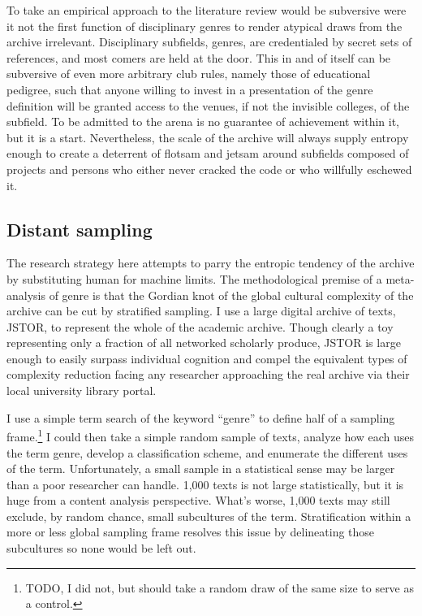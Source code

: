\documentclass[]{book}
\let\rmarkdownfootnote\footnote%
\def\footnote{\protect\rmarkdownfootnote}
\theoremstyle{definition}
\theoremstyle{definition}
\theoremstyle{definition}
\theoremstyle{remark}
\begin{document}
To take an empirical approach to the literature review would be
subversive were it not the first function of disciplinary genres to
render atypical draws from the archive irrelevant. Disciplinary
subfields, genres, are credentialed by secret sets of references, and
most comers are held at the door. This in and of itself can be
subversive of even more arbitrary club rules, namely those of
educational pedigree, such that anyone willing to invest in a
presentation of the genre definition will be granted access to the
venues, if not the invisible colleges, of the subfield. To be admitted
to the arena is no guarantee of achievement within it, but it is a
start. Nevertheless, the scale of the archive will always supply entropy
enough to create a deterrent of flotsam and jetsam around subfields
composed of projects and persons who either never cracked the code or
who willfully eschewed it.

\hypertarget{distant-sampling}{%
\subsection{Distant sampling}\label{distant-sampling}}

The research strategy here attempts to parry the entropic tendency of
the archive by substituting human for machine limits. The methodological
premise of a meta-analysis of genre is that the Gordian knot of the
global cultural complexity of the archive can be cut by stratified
sampling. I use a large digital archive of texts, JSTOR, to represent
the whole of the academic archive. Though clearly a toy representing
only a fraction of all networked scholarly produce, JSTOR is large
enough to easily surpass individual cognition and compel the equivalent
types of complexity reduction facing any researcher approaching the real
archive via their local university library portal.

I use a simple term search of the keyword ``genre'' to define half of a
sampling frame.\footnote{TODO, I did not, but should take a random draw
  of the same size to serve as a control.} I could then take a simple
random sample of texts, analyze how each uses the term genre, develop a
classification scheme, and enumerate the different uses of the term.
Unfortunately, a small sample in a statistical sense may be larger than
a poor researcher can handle. 1,000 texts is not large statistically,
but it is huge from a content analysis perspective. What's worse, 1,000
texts may still exclude, by random chance, small subcultures of the
term. Stratification within a more or less global sampling frame
resolves this issue by delineating those subcultures so none would be
left out.
\end{document}
